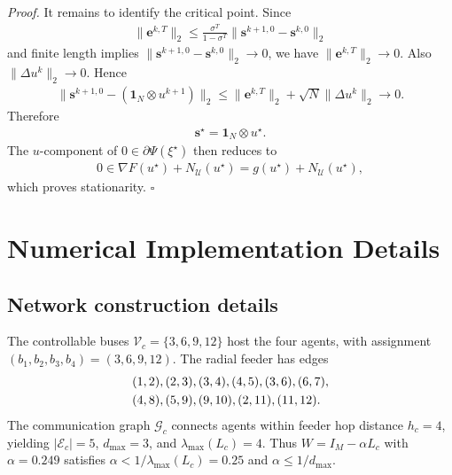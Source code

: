 \documentclass[letterpaper, 10 pt, conference]{ieeeconf} %
\newenvironment{proof}[1][Proof]{\par\noindent\textit{#1. }\ignorespaces}
  {\hfill$\square$\par}
\begin{document}
\begin{proof}
It remains to identify the critical point. Since
\begin{align}
\|\mathbf e^{k,T}\|_2
\le
\frac{\sigma^T}{1-\sigma^T}
\|\mathbf s^{k+1,0}-\mathbf s^{k,0}\|_2
\end{align}
and finite length implies
\(\|\mathbf s^{k+1,0}-\mathbf s^{k,0}\|_2\to0\), we have
\(\|\mathbf e^{k,T}\|_2\to0\). Also
\(\|\Delta u^k\|_2\to0\). Hence
\begin{align}
\|\mathbf s^{k+1,0}-(\mathbf 1_N\otimes u^{k+1})\|_2
\le
\|\mathbf e^{k,T}\|_2+\sqrt N\|\Delta u^k\|_2
\to0 .
\end{align}
Therefore
\begin{align}
\mathbf s^\star=\mathbf 1_N\otimes u^\star .
\end{align}
The \(u\)-component of
\(0\in\partial\Psi(\xi^\star)\) then reduces to
\begin{align}
0\in\nabla F(u^\star)+N_{\mathcal U}(u^\star)
=
g(u^\star)+N_{\mathcal U}(u^\star),
\end{align}
which proves stationarity.
\end{proof}

\section{Numerical Implementation Details}
\label{app:numerical_details}

\subsection{Network construction details}
The controllable buses \(\mathcal V_c=\{3,6,9,12\}\) host the four agents, with assignment \((b_1,b_2,b_3,b_4)=(3,6,9,12)\). The radial feeder has edges
\begin{align}
&(1,2),(2,3),(3,4),(4,5),(3,6),(6,7),\notag\\
&(4,8),(5,9),(9,10),(2,11),(11,12).
\end{align}
The communication graph \(\mathcal G_c\) connects agents within feeder hop distance \(h_c=4\), yielding \(|\mathcal E_c|=5\), \(d_{\max}=3\), and \(\lambda_{\max}(L_c)=4\). Thus \(W=I_M-\alpha L_c\) with \(\alpha=0.249\) satisfies \(\alpha<1/\lambda_{\max}(L_c)=0.25\) and \(\alpha\le1/d_{\max}\).
\end{document}
